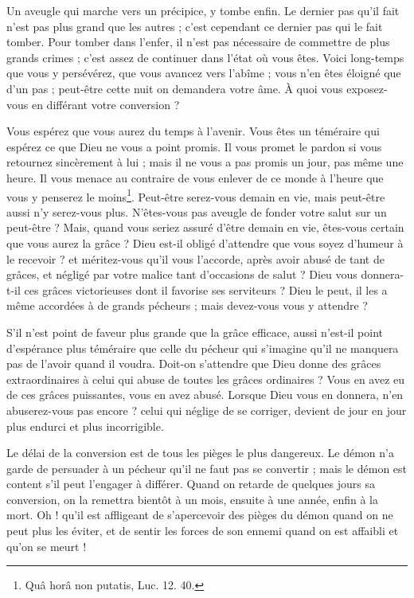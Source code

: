 \documentclass[instructions.tex]{subfiles}
\begin{document}
Un aveugle qui marche vers un précipice, y tombe enfin. Le dernier pas qu’il fait n’est pas plus grand que les autres ; c’est cependant ce dernier pas qui le fait tomber. Pour tomber dans l’enfer, il n’est pas nécessaire de commettre de plus grands crimes ; c’est assez de continuer dans l’état où vous êtes. Voici long-temps que vous y persévérez, que vous avancez vers l’abîme ; vous n’en êtes éloigné que d’un pas ; peut-être cette nuit on demandera votre âme. À quoi vous exposez-vous en différant votre conversion ?

Vous espérez que vous aurez du temps à l’avenir. Vous êtes un téméraire qui espérez ce que Dieu ne vous a point promis. Il vous promet le pardon si vous retournez sincèrement à lui ; mais il ne vous a pas promis un jour, pas même une heure. Il vous menace au contraire de vous enlever de ce monde à l’heure que vous y penserez le moins\footnote{Quâ horâ non putatis, Luc. 12. 40.}. Peut-être serez-vous demain en vie, mais peut-être aussi n’y serez-vous plus. N’êtes-vous pas aveugle de fonder votre salut sur un peut-être ? Mais, quand vous seriez assuré d’être demain en vie, êtes-vous certain que vous aurez la grâce ? Dieu est-il obligé d’attendre que vous soyez d’humeur à le recevoir ? et méritez-vous qu’il vous l’accorde, après avoir abusé de tant de grâces, et négligé par votre malice tant d’occasions de salut ? Dieu vous donnera-t-il ces grâces victorieuses dont il favorise ses serviteurs ? Dieu le peut, il les a même accordées à de grands pécheurs ; mais devez-vous vous y attendre ?

S’il n’est point de faveur plus grande que la grâce efficace, aussi n’est-il point d’espérance plus téméraire que celle du pécheur qui s’imagine qu’il ne manquera pas de l’avoir quand il voudra. Doit-on s’attendre que Dieu donne des grâces extraordinaires à celui qui abuse de toutes les grâces ordinaires ? Vous en avez eu de ces grâces puissantes, vous en avez abusé. Lorsque Dieu vous en donnera, n’en abuserez-vous pas encore ? celui qui néglige de se corriger, devient de jour en jour plus endurci et plus incorrigible.

Le délai de la conversion est de tous les pièges le plus dangereux. Le démon n’a garde de persuader à un pécheur qu’il ne faut pas se convertir ; mais le démon est content s’il peut l’engager à différer. Quand on retarde de quelques jours sa conversion, on la remettra bientôt à un mois, ensuite à une année, enfin à la mort. Oh ! qu’il est affligeant de s’apercevoir des pièges du démon quand on ne peut plus les éviter, et de sentir les forces de son ennemi quand on est affaibli et qu’on se meurt !
\end{document}
